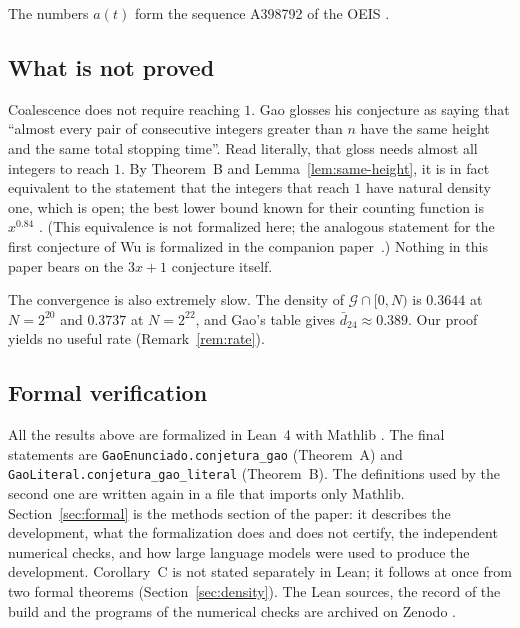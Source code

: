 \documentclass[11pt]{amsart}
\theoremstyle{definition}
\theoremstyle{remark}
\newcommand{\dbar}{\bar d}
\newcommand{\lean}[1]{\nolinkurl{#1}}
\begin{document}
The numbers $a(t)$ form the sequence A398792 of the OEIS \cite{OEIS}.

\subsection{What is not proved}
Coalescence does not require reaching $1$. Gao glosses his conjecture as saying that ``almost every pair of consecutive integers greater than $n$ have the same height and the same total stopping time''. Read literally, that gloss needs almost all integers to reach $1$. By Theorem~B and Lemma~\ref{lem:same-height}, it is in fact equivalent to the statement that the integers that reach $1$ have natural density one, which is open; the best lower bound known for their counting function is $x^{0.84}$ \cite{KL03}. (This equivalence is not formalized here; the analogous statement for the first conjecture of Wu \cite{Wu92} is formalized in the companion paper~\cite{SaidWu}.) Nothing in this paper bears on the $3x+1$ conjecture itself.

The convergence is also extremely slow. The density of $\mathcal G\cap[0,N)$ is $0.3644$ at $N=2^{20}$ and $0.3737$ at $N=2^{22}$, and Gao's table gives $\dbar_{24}\approx0.389$. Our proof yields no useful rate (Remark~\ref{rem:rate}).

\subsection{Formal verification}
All the results above are formalized in Lean~4 \cite{Lean4} with Mathlib \cite{Mathlib}. The final statements are \lean{GaoEnunciado.conjetura_gao} (Theorem~A) and \lean{GaoLiteral.conjetura_gao_literal} (Theorem~B). The definitions used by the second one are written again in a file that imports only Mathlib. Section~\ref{sec:formal} is the methods section of the paper: it describes the development, what the formalization does and does not certify, the independent numerical checks, and how large language models were used to produce the development. Corollary~C is not stated separately in Lean; it follows at once from two formal theorems (Section~\ref{sec:density}). The Lean sources, the record of the build and the programs of the numerical checks are archived on Zenodo \cite{Artifact}.
\end{document}
